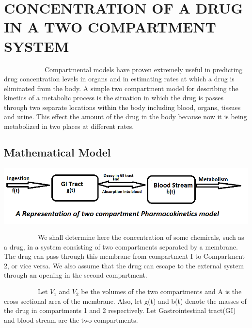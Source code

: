 \pagebreak


\section{CONCENTRATION OF A DRUG IN A TWO COMPARTMENT SYSTEM}


\par ~~~~~~~~~~~~Compartmental models have proven extremely useful in predicting drug concentration levels in organs and in estimating rates at which a drug is eliminated from the body. A simple two compartment model for describing the kinetics of a metabolic process is the situation in which the drug is passes through two separate locations within the body including blood, organs, tissues and urine. This effect the amount of the drug in the body because now it is being metabolized in two places at different rates.

\subsection*{Mathematical Model}

\begin{center}
	
	\scalebox{0.70} %
	{\includegraphics{graph8.png}}
\end{center}

\par ~~~~~~~~~~We shall determine here the concentration of some chemicals, such as a drug, in a system consisting of two compartments separated by a membrane. The drug can pass through this membrane from compartment I to Compartment 2, or vice versa. We also assume that the drug can escape to the external system through an opening in the second compartment.


\par ~~~~~~~~~~Let $V_{1}$ and $V_{2}$ be the volumes of the two compartments and A is the cross sectional area of the membrane.  Also, let g(t) and b(t) denote the masses of the drug in compartments 1 and 2 respectively. 
Let Gastrointestinal tract(GI) and blood stream are the two compartments.\\

